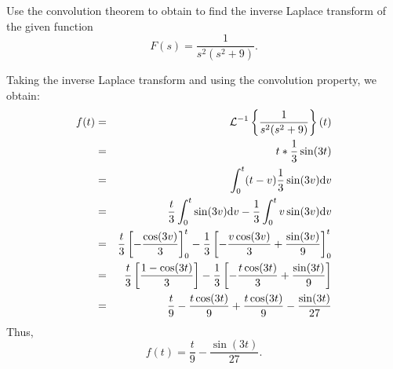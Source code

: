 \documentclass[11pt]{article}
\begin{document}
\begin{problem}
Use the convolution theorem to obtain to find the inverse Laplace transform of the given function
\begin{equation*}
F(s) = \dfrac{1}{s^2 (s^2+9)}.
\end{equation*}
\end{problem}
\begin{solution}
Taking the inverse Laplace transform and using the convolution property, we obtain:
\begin{eqnarray*}
f(t) & = & {\cal L}^{-1} \left\{ \dfrac{1}{s^2 (s^2+9)} \right\}(t) \\
& = & t * \dfrac{1}{3} \sin(3t) \\
& = &  \int_{0}^{t} (t-v)\dfrac{1}{3} \sin(3v) {\rm d} v \\
& = &  \dfrac{t}{3}\int_{0}^{t}\sin(3v) {\rm d} v  - \dfrac{1}{3}\int_{0}^{t}v\sin(3v) {\rm d} v \\
& = &  \dfrac{t}{3} \left[ -\dfrac{\cos(3v)}{3} \right]_{0}^{t}  - \dfrac{1}{3} \left[ -\dfrac{v \cos(3v)}{3} + \dfrac{\sin(3v)}{9} \right]_{0}^{t} \\
& = &  \dfrac{t}{3} \left[ \dfrac{1-\cos(3t)}{3}  \right]  - \dfrac{1}{3} \left[ -\dfrac{t \cos(3t)}{3} + \dfrac{\sin(3t)}{9} \right] \\
& = &  \dfrac{t}{9} - \dfrac{t\cos(3t)}{9}   +\dfrac{t \cos(3t)}{9} - \dfrac{\sin(3t)}{27}
\end{eqnarray*}
Thus,
\[\boxed{ f(t) = \dfrac{t}{9} - \dfrac{\sin(3t)}{27}}.\]
\end{solution}
\end{document}
